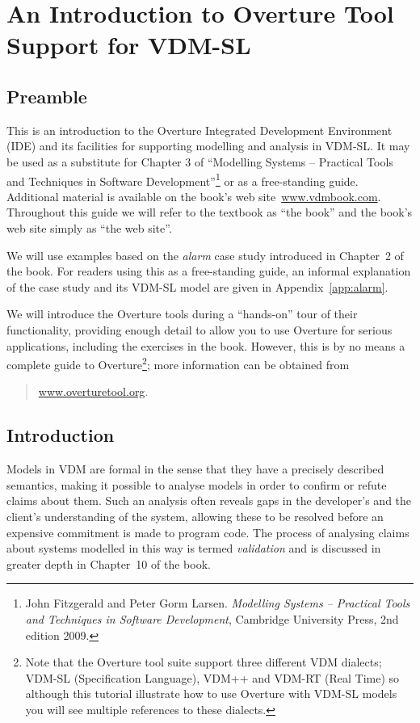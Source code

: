\chapter{An Introduction to Overture Tool Support for VDM-SL}\label{cha:toolbox}
\initexercise

\section*{Preamble}

This is an introduction to the Overture Integrated Development Environment (IDE) and its facilities for supporting modelling and analysis in VDM-SL. It may be used as a substitute for Chapter 3 of
``Modelling Systems -- Practical Tools and Techniques in Software Development''\footnote{John Fitzgerald and Peter Gorm Larsen. \emph{Modelling Systems -- Practical Tools and Techniques in Software Development}, Cambridge University Press, 2nd edition 2009.} or as a free-standing guide. Additional material is available on the book's web site~\url{www.vdmbook.com}. Throughout this guide we will refer to the textbook as ``the book'' and the book's web site simply as ``the web site''.

We will use examples based on the \emph{alarm} case study introduced in Chapter~2 of the book. For readers using this as a free-standing guide, an informal explanation of the case study and its
VDM-SL model are given in Appendix~\ref{app:alarm}.

We will introduce the Overture tools during a ``hands-on'' tour of their functionality, providing enough detail to allow you to use Overture for serious applications, including the exercises in the
book. However, this is by no means a complete guide to Overture\footnote{Note that the Overture tool suite support three different VDM dialects; VDM-SL (Specification Language), VDM++ and
  VDM-RT (Real Time) so although this tutorial illustrate how to use Overture with VDM-SL models you will see multiple references to these dialects.}; more information can be obtained from
%
\begin{quote}
\url{www.overturetool.org}.
\end{quote}
%
\section{Introduction}
%
Models in VDM are formal in the sense that they have a precisely described semantics, making it possible to analyse models in order to confirm or refute claims about them. Such an analysis often reveals gaps in the developer's and the client's understanding of the system,
allowing these to be resolved before an expensive commitment is made to program code. The process of analysing claims about systems modelled in this way is termed \emph{validation} and is discussed in greater depth in Chapter~10 of the book.

